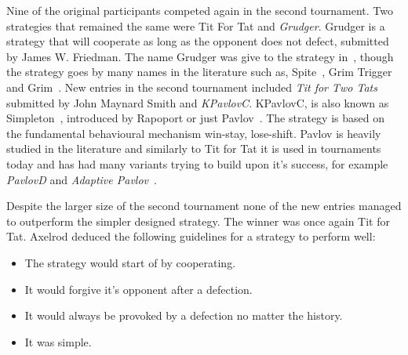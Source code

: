 Nine of the original participants competed again in the second tournament. Two
strategies that remained the same were Tit For Tat and \textit{Grudger}. Grudger
is a strategy that will cooperate as long as the opponent does not defect,
submitted by James W. Friedman. The name Grudger was give to the strategy
in~\cite{Li20141}, though the strategy goes by many names in the literature such
as, Spite~\cite{Beaufils1997}, Grim Trigger~\cite{Banks1990} and
Grim~\cite{Van2015}. New entries in the second tournament included \textit{Tit
for Two Tats} submitted by John Maynard Smith and \textit{KPavlovC}. KPavlovC,
is also known as Simpleton~\cite{rapoport1965}, introduced by Rapoport or just
Pavlov~\cite{Nowak1993}. The strategy is based on the fundamental behavioural
mechanism win-stay, lose-shift. Pavlov is heavily studied in the literature and
similarly to Tit for Tat it is used in tournaments today and has
had many variants trying to build upon it's success, for example
\textit{PavlovD} and \textit{Adaptive Pavlov}~\cite{Li2007}.

Despite the larger size of the second tournament none of the new entries managed
to outperform the simpler designed strategy. The winner was once again Tit for
Tat. Axelrod deduced the following guidelines for a strategy to perform well:

\begin{itemize}
    \item The strategy would start of by cooperating.
    \item It would forgive it's opponent after a defection.
    \item It would always be provoked by a defection no matter the history.
    \item It was simple.
\end{itemize}

